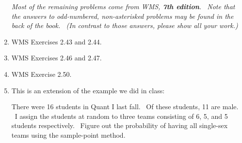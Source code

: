 \documentclass[11pt]{article}
\begin{document}
\begin{enumerate}
\textit{Most of the remaining problems come from WMS, \textbf{7th edition}.
\ Note that the answers to odd-numbered, non-asterisked problems may be
found in the back of the book. \ (In contrast to those answers, please show
all your work.)}\bigskip 

\item WMS Exercises 2.43 and 2.44.

\item WMS Exercises 2.46 and 2.47.

\item WMS Exercise 2.50.

\item This is an extension of the example we did in class:

There were 16 students in Quant I last fall. \ Of these students, 11 are
male. \ I assign the students at random to three teams consisting of 6, 5,
and 5 students respectively. \ Figure out the probability of having all
single-sex teams using the sample-point method.
\end{enumerate}

\bigskip
\end{document}

